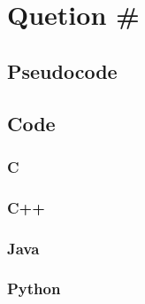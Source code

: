 \documentclass[11pt]{article}
\begin{document}
\section{Quetion \#}

\subsection{Pseudocode}

\subsection{Code}
\subsubsection{C}
\subsubsection{C++}
\subsubsection{Java}
\subsubsection{Python}
\end{document}
